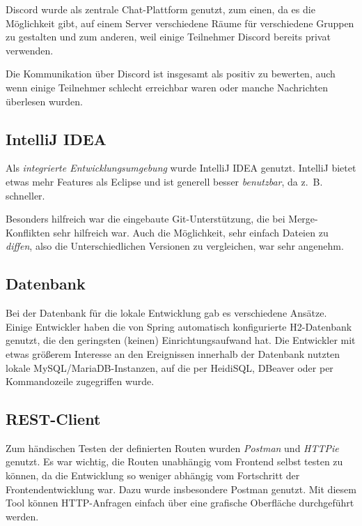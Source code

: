 \documentclass[a4paper, 11pt]{article}
\begin{document}
Discord wurde als zentrale Chat-Plattform genutzt, zum einen, da es die
Möglichkeit gibt, auf einem Server verschiedene Räume für verschiedene Gruppen
zu gestalten und zum anderen, weil einige Teilnehmer Discord bereits privat  
verwenden.

Die Kommunikation über Discord ist insgesamt als positiv zu bewerten, auch wenn
einige Teilnehmer schlecht erreichbar waren oder manche Nachrichten überlesen
wurden.

\subsection{IntelliJ IDEA}

Als \emph{integrierte Entwicklungsumgebung} wurde IntelliJ IDEA genutzt.
IntelliJ bietet etwas mehr Features als Eclipse und ist generell besser
\emph{benutzbar}, da z.~B. schneller.

Besonders hilfreich war die eingebaute Git-Unterstützung, die bei
Merge-Konflikten sehr hilfreich war. Auch die Möglichkeit, sehr einfach Dateien
zu \emph{diffen}, also die Unterschiedlichen Versionen zu vergleichen, war sehr
angenehm.

\subsection{Datenbank}

Bei der Datenbank für die lokale Entwicklung gab es verschiedene Ansätze.
Einige Entwickler haben die von Spring automatisch konfigurierte H2-Datenbank
genutzt, die den geringsten (keinen) Einrichtungsaufwand hat. Die Entwickler
mit etwas größerem Interesse an den Ereignissen innerhalb der Datenbank nutzten
lokale MySQL/MariaDB-Instanzen, auf die per HeidiSQL, DBeaver oder per
Kommandozeile zugegriffen wurde.

\subsection{REST-Client}

Zum händischen Testen der definierten Routen wurden \emph{Postman} und
\emph{HTTPie} genutzt. Es war wichtig, die Routen unabhängig vom Frontend selbst
testen zu können, da die Entwicklung so weniger abhängig vom Fortschritt der
Frontendentwicklung war. Dazu wurde insbesondere Postman genutzt. Mit diesem
Tool können HTTP-Anfragen einfach über eine grafische Oberfläche durchgeführt
werden.
\end{document}
